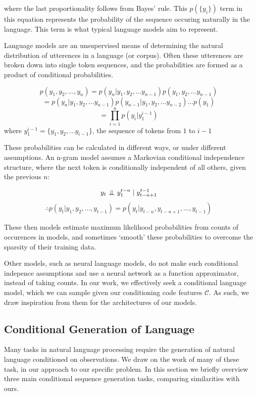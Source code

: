 where the last proportionality follows from Bayes' rule.
This $p(\{y_i\})$ term in this equation represents the probability of the sequence occuring naturally in the language. This term is what typical language models aim to represent.

Language models are an unsupervised means of determining the natural distribution of utterences in a language (or corpus). 
Often these utterences are broken down into single token sequences, and the probabilities are formed as a product of conditional probabilities.

$$p(y_1, y_2,...,y_n ) = p(y_n | y_1, y_2,...y_{n-1} )  p(y_1, y_2,...y_{n-1} )$$
$$= p(y_n | y_1, y_2,...y_{n-1} ) p(y_{n-1} | y_1, y_2,...y_{n-2} )...p(y_1)$$
$$ = \prod_{i=1}^{n} p(y_i | y_1^{i-1} ) $$ where $y_1^{i-1} =  \{y_1, y_2,...y_{i-1}\}$, the sequence of tokens from $1$ to $i-1$

These probabilities can be calculated in different ways, or under different assumptions. An n-gram model assumes a Markovian conditional independence structure, where the next token is conditionally independent of all others, given the previous $n$: 

$$ y_t \mathrel{\perp\mspace{-10mu}\perp} y_1^{t-n} \mid y^{t-1}_{t-n+1} $$
$$\therefore p(y_t | y_1, y_2,..., y_{t-1} )  = p(y_t | y_{t-n}, y_{t-n+1},..., y_{t-1}  ) $$

These then models estimate maximum likelihood probabilities from counts of occurences in models, and sometimes `smooth' these probabilities to overcome the sparsity of their training data.

Other models, such as neural language models, do not make such conditional indepence assumptions and use a neural network as a function approximator, instead of taking counts.
In our work, we effectively seek a conditional language model, which we can sample given our conditioning code features $\mathcal{C}$. As such, we draw inspiration from them for the architectures of our models.

\subsection{Conditional Generation of Language}

Many tasks in natural language processing require the generation of natural language conditioned on observations.
We draw on the work of many of these task, in our approach to our specific problem.
In this section we briefly overview three main conditional sequence generation tasks, comparing similarities with ours.


